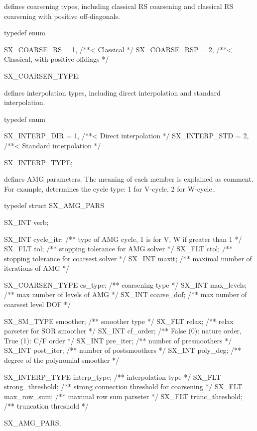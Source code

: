 defines coarsening types, including classical RS coarsening and
classical RS coarsening with positive off-diagonals.
\begin{evb}
typedef enum
{
    SX_COARSE_RS      = 1,  /**< Classical */
    SX_COARSE_RSP     = 2,  /**< Classical, with positive offdiags */

} SX_COARSEN_TYPE;
\end{evb}


 defines interpolation types, including direct interpolation
and standard interpolation.
\begin{evb}
typedef enum
{
    SX_INTERP_DIR     = 1,  /**< Direct interpolation */
    SX_INTERP_STD     = 2,  /**< Standard interpolation */

} SX_INTERP_TYPE;
\end{evb}


 defines AMG parameters. The meaning of each member is explained as comment. For example,
determines the cycle type: 1 for V-cycle, 2 for W-cycle..
\begin{evb}
typedef struct SX_AMG_PARS
{
    SX_INT verb;

    SX_INT cycle_itr;          /** type of AMG cycle, 1 is for V, W if greater than 1 */
    SX_FLT tol;                /** stopping tolerance for AMG solver */
    SX_FLT ctol;               /** stopping tolerance for coarsest solver */
    SX_INT maxit;              /** maximal number of iterations of AMG */

    SX_COARSEN_TYPE cs_type;     /** coarsening type */
    SX_INT max_levels;           /** max number of levels of AMG */
    SX_INT coarse_dof;           /** max number of coarsest level DOF */

    SX_SM_TYPE smoother;         /** smoother type */
    SX_FLT     relax;            /** relax parseter for SOR smoother */
    SX_INT     cf_order;         /** False (0): nature order, True (1): C/F order */
    SX_INT     pre_iter;         /** number of presmoothers */
    SX_INT     post_iter;        /** number of postsmoothers */
    SX_INT     poly_deg;         /** degree of the polynomial smoother */

    SX_INTERP_TYPE interp_type;  /** interpolation type */
    SX_FLT strong_threshold;     /** strong connection threshold for coarsening */
    SX_FLT max_row_sum;          /** maximal row sum parseter */
    SX_FLT trunc_threshold;      /** truncation threshold */

} SX_AMG_PARS;
\end{evb}

